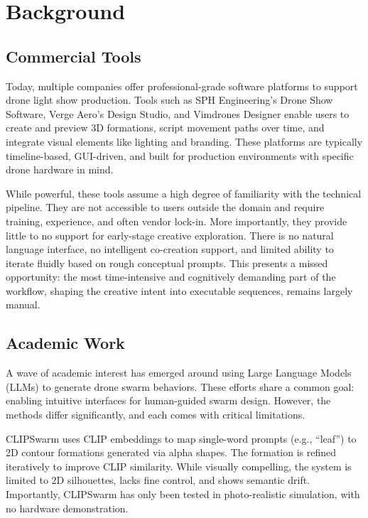 
\section{Background}
\subsection{Commercial Tools}
Today, multiple companies offer professional-grade software platforms to support drone light show production. Tools such as SPH Engineering’s Drone Show Software, Verge Aero's Design Studio, and Vimdrones Designer enable users to create and preview 3D formations, script movement paths over time, and integrate visual elements like lighting and branding. These platforms are typically timeline-based, GUI-driven, and built for production environments with specific drone hardware in mind.

While powerful, these tools assume a high degree of familiarity with the technical pipeline. They are not accessible to users outside the domain and require training, experience, and often vendor lock-in. More importantly, they provide little to no support for early-stage creative exploration. There is no natural language interface, no intelligent co-creation support, and limited ability to iterate fluidly based on rough conceptual prompts. This presents a missed opportunity: the most time-intensive and cognitively demanding part of the workflow, shaping the creative intent into executable sequences, remains largely manual.

\subsection{Academic Work}
A wave of academic interest has emerged around using Large Language Models (LLMs) to generate drone swarm behaviors. These efforts share a common goal: enabling intuitive interfaces for human-guided swarm design. However, the methods differ significantly, and each comes with critical limitations.

CLIPSwarm uses CLIP embeddings to map single-word prompts (e.g., “leaf”) to 2D contour formations generated via alpha shapes. The formation is refined iteratively to improve CLIP similarity. While visually compelling, the system is limited to 2D silhouettes, lacks fine control, and shows semantic drift. Importantly, CLIPSwarm has only been tested in photo-realistic simulation, with no hardware demonstration.

